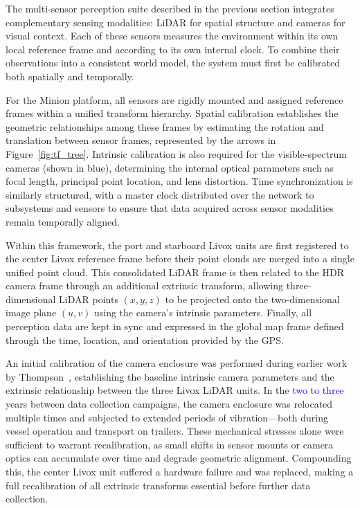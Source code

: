 \documentclass{erauthesis}
\begin{document}
The multi-sensor perception suite described in the previous section integrates complementary sensing modalities: \ac{LiDAR} for spatial structure and cameras for visual context.
Each of these sensors measures the environment within its own local reference frame and according to its own internal clock.
To combine their observations into a consistent world model, the system must first be calibrated both spatially and temporally.

For the Minion platform, all sensors are rigidly mounted and assigned reference frames within a unified transform hierarchy.
Spatial calibration establishes the geometric relationships among these frames by estimating the rotation and translation between sensor frames, represented by the arrows in Figure~\ref{fig:tf_tree}.  
Intrinsic calibration is also required for the visible-spectrum cameras (shown in blue), determining the internal optical parameters such as focal length, principal point location, and lens distortion. %
Time synchronization is similarly structured, with a master clock distributed over the network to subsystems and sensors to ensure that data acquired across sensor modalities remain temporally aligned.

Within this framework, the port and starboard Livox units are first registered to the center Livox reference frame before their point clouds are merged into a single unified point cloud.  
This consolidated LiDAR frame is then related to the HDR camera frame through an additional extrinsic transform, allowing three-dimensional LiDAR points $(x, y, z)$ to be projected onto the two-dimensional image plane $(u, v)$ using the camera’s intrinsic parameters.  
Finally, all perception data are kept in sync and expressed in the global map frame defined through the time, location, and orientation provided by the \ac{GPS}.

An initial calibration of the camera enclosure was performed during earlier work by Thompson~\cite{thompson2023}, establishing the baseline intrinsic camera parameters and the extrinsic relationship between the three Livox LiDAR units.
In the \textcolor{blue}{two to three} years between data collection campaigns, the camera enclosure was relocated multiple times and subjected to extended periods of vibration—both during vessel operation and transport on trailers.
These mechanical stresses alone were sufficient to warrant recalibration, as small shifts in sensor mounts or camera optics can accumulate over time and degrade geometric alignment.
Compounding this, the center Livox unit suffered a hardware failure and was replaced, making a full recalibration of all extrinsic transforms essential before further data collection.
\end{document}
